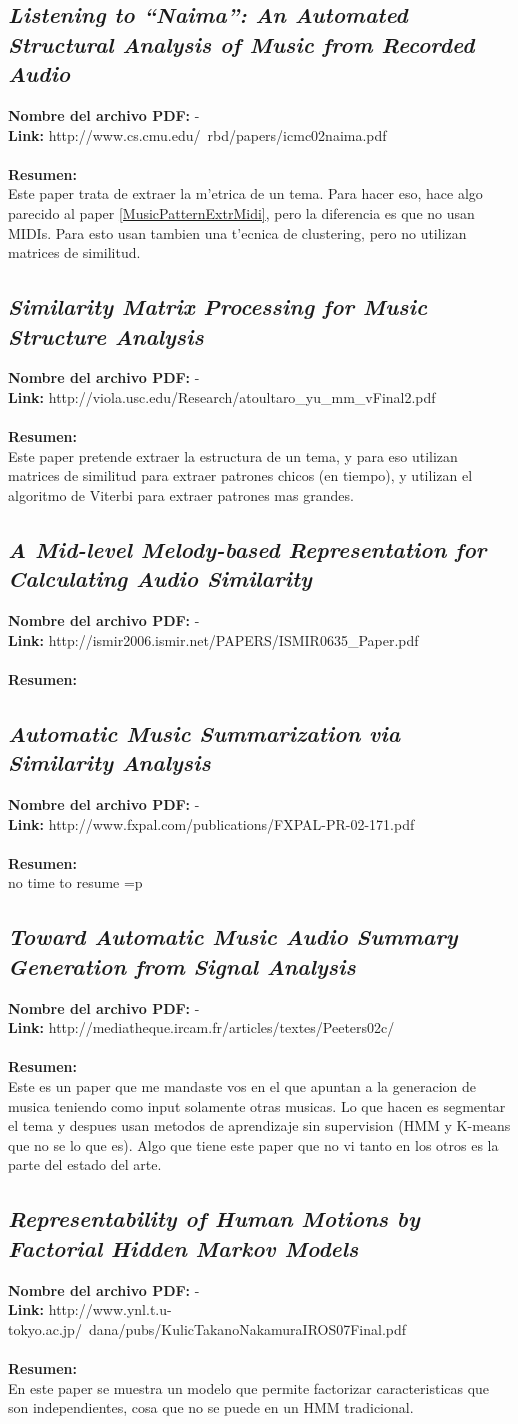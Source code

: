 \documentclass[a4paper,10pt]{article}
\newcommand{\titulo}[1]{\def\Titulo{#1}}
\newcommand{\resumen}[1]{\def\Resumen{#1}}
\newcommand{\link}[1]{\def\Link{#1}}
\newenvironment{resumenpaper}{
\let\Titulo\empty
\let\Resumen\empty
\let\Archivo-
\let\Link-
\let\Id\empty
}{
\subsection{\textit{\Titulo}}
\label{\Id}
\noindent \textbf{Nombre del archivo PDF: }{\Archivo}\\
\noindent \textbf{Link: }{\Link}\\ \\
\noindent \textbf{Resumen:} \\ {\Resumen}
}
\begin{document}
\begin{resumenpaper}
 \titulo{Listening to ``Naima'': An Automated Structural Analysis of Music from Recorded Audio}
 \link{http://www.cs.cmu.edu/~rbd/papers/icmc02naima.pdf}
 \resumen{Este paper trata de extraer la m'etrica de un tema. Para hacer eso, hace algo parecido al paper \ref{MusicPatternExtrMidi}, pero la diferencia es que no usan MIDIs. Para esto usan tambien una t'ecnica de clustering, pero no utilizan matrices de similitud.}
\end{resumenpaper}

\begin{resumenpaper}
 \titulo{Similarity Matrix Processing for Music Structure Analysis}
 \link{http://viola.usc.edu/Research/atoultaro\_yu\_mm\_vFinal2.pdf}
 \resumen{Este paper pretende extraer la estructura de un tema, y para eso utilizan matrices de similitud para extraer patrones chicos (en tiempo), y utilizan el algoritmo de Viterbi para extraer patrones mas grandes.}
\end{resumenpaper}

\begin{resumenpaper}
 \titulo{A Mid-level Melody-based Representation for Calculating Audio Similarity}
 \link{http://ismir2006.ismir.net/PAPERS/ISMIR0635\_Paper.pdf}
 \resumen{}
\end{resumenpaper}

\begin{resumenpaper}
 \titulo{Automatic Music Summarization via Similarity Analysis}
 \link{http://www.fxpal.com/publications/FXPAL-PR-02-171.pdf}
 \resumen{no time to resume =p}
\end{resumenpaper}


\begin{resumenpaper}
 \titulo{Toward Automatic Music Audio Summary Generation from Signal Analysis}
 \link{http://mediatheque.ircam.fr/articles/textes/Peeters02c/}
 \resumen{Este es un paper que me mandaste vos en el que apuntan a la generacion de musica teniendo como input solamente otras musicas. Lo que hacen es segmentar el tema y despues usan metodos de aprendizaje sin supervision (HMM y K-means que no se lo que es). Algo que tiene este paper que no vi tanto en los otros es la parte del estado del arte.}
\end{resumenpaper}

\begin{resumenpaper}
 \titulo{Representability of Human Motions by Factorial Hidden Markov Models }
 \link{http://www.ynl.t.u-tokyo.ac.jp/~dana/pubs/KulicTakanoNakamuraIROS07Final.pdf}
 \resumen{En este paper se muestra un modelo que permite factorizar caracteristicas que son independientes, cosa que no se puede en un HMM tradicional. }
\end{resumenpaper}
\end{document}
